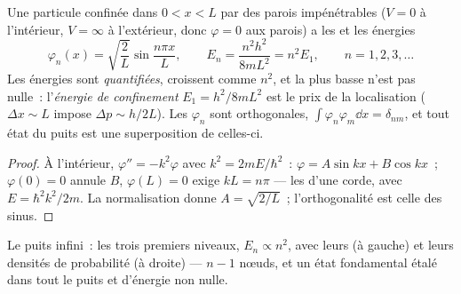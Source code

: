 \begin{proposition}\label{prop:b2:potential-wells-tunneling:infinite}
Une particule confinée dans $0 < x < L$ par des parois impénétrables ($V = 0$
à l'intérieur, $V = \infty$ à l'extérieur, donc $\varphi = 0$ aux parois) a les
 et les énergies
\[
\varphi_n(x) = \sqrt{\frac{2}{L}}\sin\frac{n\pi x}{L}, \qquad
E_n = \frac{n^2h^2}{8mL^2} = n^2E_1, \qquad n = 1, 2, 3, \dots
\]
Les énergies sont \emph{quantifiées}, croissent
comme $n^2$, et la plus basse n'est pas nulle~: l'\emph{énergie de
confinement} $E_1 = h^2/8mL^2$ est le prix de la
localisation ($\Delta x \sim L$ impose $\Delta p \sim h/2L$). Les
$\varphi_n$ sont orthogonales, $\int\varphi_n\varphi_m\dd x = \delta_{nm}$, et tout
état du puits est une superposition de celles-ci.
\end{proposition}

\begin{proof}
À l'intérieur, $\varphi'' = -k^2\varphi$ avec $k^2 = 2mE/\hbar^2$~: $\varphi = A\sin kx
+ B\cos kx$~; $\varphi(0) = 0$ annule $B$, $\varphi(L) = 0$ exige $kL = n\pi$
--- les  d'une corde, avec $E = \hbar^2k^2/2m$. La
normalisation donne $A = \sqrt{2/L}$~; l'orthogonalité est celle des
sinus.
\end{proof}

\begin{omfigure}

{\small Le puits infini~: les trois premiers niveaux, $E_n \propto n^2$,
avec leurs  (à gauche) et leurs densités de probabilité (à droite) ---
$n - 1$ nœuds, et un état fondamental étalé dans tout le puits et
d'énergie non nulle.}
\end{omfigure}

